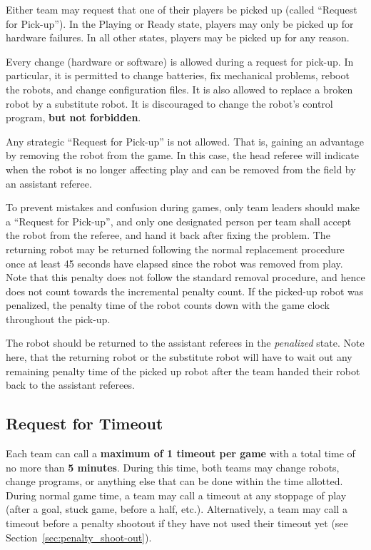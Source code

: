 \documentclass[12pt]{article}
\newcommand{\cf}{see\xspace}
\begin{document}
Either team may request that one of their players be picked up (called ``Request for Pick-up''). 
In the Playing or Ready state, players may only be picked up for hardware failures.  
In all other states, players may be picked up for any reason.

Every change (hardware or software) is allowed during a request for pick-up. In particular,
it is permitted to change batteries, fix mechanical problems, reboot the robots, and change configuration files.
It is also allowed to replace a broken robot by a substitute robot.
It is discouraged to change the robot's control program, \textbf{but not forbidden}.

Any strategic ``Request for Pick-up'' is not allowed.
That is, gaining an advantage by removing the robot from the game.
In this case, the head referee will indicate when the robot is no longer affecting play and can be removed from the field by an assistant referee.

To prevent mistakes and confusion during games, only team leaders should make a ``Request for Pick-up'', and only one designated person per team shall accept the robot from the referee, and hand it back after fixing the problem.
The returning robot may be returned following the normal replacement procedure once at least 45 seconds have elapsed since the robot was removed from play.
Note that this penalty does not follow the standard removal procedure, and hence does not count towards the incremental penalty count.
If the picked-up robot was penalized, the penalty time of the robot counts down with the game clock throughout the pick-up.

The robot should be returned to the assistant referees in the \emph{penalized} state.
Note here, that the returning robot or the substitute robot will have to wait out any remaining penalty time of the picked up robot after the team handed their robot back to the assistant referees.

\subsection{Request for Timeout}
\label{sec:request_for_timeout}

Each team can call a \textbf{maximum of 1 timeout per game} with a total time of no more than \textbf{5 minutes}. During this time, both teams may change robots, change programs, or anything else that can be done within the time allotted.  During normal game time, a team may call a timeout at any stoppage of play (after a goal, stuck game, before a half, etc.). Alternatively, a team may call a timeout before a penalty shootout if they have not used their timeout yet (\cf Section~\ref{sec:penalty_shoot-out}).
\end{document}
